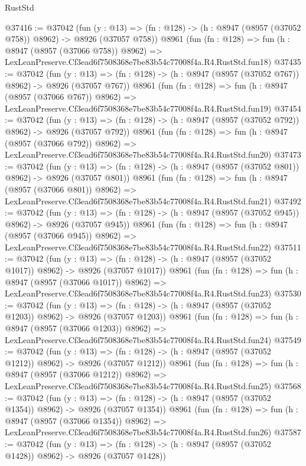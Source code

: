 \begin{lexlean}{RustStd}
\begin{coremodule}
@37416 := @37042
    (fun (y : @13) => (fn : @128) -> (h : @8947 (@8957 (@37052 @758)) @8962) -> @8926 (@37057 @758))
    @8961
    (fun (fn : @128) =>
    fun (h : @8947 (@8957 (@37066 @758)) @8962) =>
    LexLeanPreserve.Cf3ead6f7508368e7be83b54c77008f4a.R4.RustStd.fun18)
@37435 := @37042
    (fun (y : @13) => (fn : @128) -> (h : @8947 (@8957 (@37052 @767)) @8962) -> @8926 (@37057 @767))
    @8961
    (fun (fn : @128) =>
    fun (h : @8947 (@8957 (@37066 @767)) @8962) =>
    LexLeanPreserve.Cf3ead6f7508368e7be83b54c77008f4a.R4.RustStd.fun19)
@37454 := @37042
    (fun (y : @13) => (fn : @128) -> (h : @8947 (@8957 (@37052 @792)) @8962) -> @8926 (@37057 @792))
    @8961
    (fun (fn : @128) =>
    fun (h : @8947 (@8957 (@37066 @792)) @8962) =>
    LexLeanPreserve.Cf3ead6f7508368e7be83b54c77008f4a.R4.RustStd.fun20)
@37473 := @37042
    (fun (y : @13) => (fn : @128) -> (h : @8947 (@8957 (@37052 @801)) @8962) -> @8926 (@37057 @801))
    @8961
    (fun (fn : @128) =>
    fun (h : @8947 (@8957 (@37066 @801)) @8962) =>
    LexLeanPreserve.Cf3ead6f7508368e7be83b54c77008f4a.R4.RustStd.fun21)
@37492 := @37042
    (fun (y : @13) => (fn : @128) -> (h : @8947 (@8957 (@37052 @945)) @8962) -> @8926 (@37057 @945))
    @8961
    (fun (fn : @128) =>
    fun (h : @8947 (@8957 (@37066 @945)) @8962) =>
    LexLeanPreserve.Cf3ead6f7508368e7be83b54c77008f4a.R4.RustStd.fun22)
@37511 := @37042
    (fun (y : @13) =>
    (fn : @128) -> (h : @8947 (@8957 (@37052 @1017)) @8962) -> @8926 (@37057 @1017))
    @8961
    (fun (fn : @128) =>
    fun (h : @8947 (@8957 (@37066 @1017)) @8962) =>
    LexLeanPreserve.Cf3ead6f7508368e7be83b54c77008f4a.R4.RustStd.fun23)
@37530 := @37042
    (fun (y : @13) =>
    (fn : @128) -> (h : @8947 (@8957 (@37052 @1203)) @8962) -> @8926 (@37057 @1203))
    @8961
    (fun (fn : @128) =>
    fun (h : @8947 (@8957 (@37066 @1203)) @8962) =>
    LexLeanPreserve.Cf3ead6f7508368e7be83b54c77008f4a.R4.RustStd.fun24)
@37549 := @37042
    (fun (y : @13) =>
    (fn : @128) -> (h : @8947 (@8957 (@37052 @1212)) @8962) -> @8926 (@37057 @1212))
    @8961
    (fun (fn : @128) =>
    fun (h : @8947 (@8957 (@37066 @1212)) @8962) =>
    LexLeanPreserve.Cf3ead6f7508368e7be83b54c77008f4a.R4.RustStd.fun25)
@37568 := @37042
    (fun (y : @13) =>
    (fn : @128) -> (h : @8947 (@8957 (@37052 @1354)) @8962) -> @8926 (@37057 @1354))
    @8961
    (fun (fn : @128) =>
    fun (h : @8947 (@8957 (@37066 @1354)) @8962) =>
    LexLeanPreserve.Cf3ead6f7508368e7be83b54c77008f4a.R4.RustStd.fun26)
@37587 := @37042
    (fun (y : @13) =>
    (fn : @128) -> (h : @8947 (@8957 (@37052 @1428)) @8962) -> @8926 (@37057 @1428))

\end{coremodule}
\end{lexlean}
